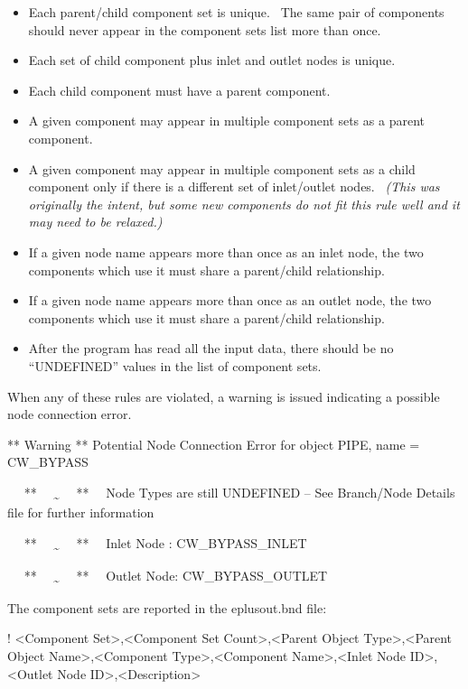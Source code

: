 \begin{itemize}
\item
  Each parent/child component set is unique.~ The same pair of components should never appear in the component sets list more than once.
\item
  Each set of child component plus inlet and outlet nodes is unique.
\item
  Each child component must have a parent component.
\item
  A given component may appear in multiple component sets as a parent component.
\item
  A given component may appear in multiple component sets as a child component only if there is a different set of inlet/outlet nodes.~ \emph{(This was originally the intent, but some new components do not fit this rule well and it may need to be relaxed.)}
\item
  If a given node name appears more than once as an inlet node, the two components which use it must share a parent/child relationship.
\item
  If a given node name appears more than once as an outlet node, the two components which use it must share a parent/child relationship.
\item
  After the program has read all the input data, there should be no ``UNDEFINED'' values in the list of component sets.
\end{itemize}

When any of these rules are violated, a warning is issued indicating a possible node connection error.

** Warning ** Potential Node Connection Error for object PIPE, name = CW\_BYPASS

~~ **~~ \textsubscript{\textasciitilde{}}~~ **~~ Node Types are still UNDEFINED -- See Branch/Node Details file for further information

~~ **~~ \textsubscript{\textasciitilde{}}~~ **~~ Inlet Node : CW\_BYPASS\_INLET

~~ **~~ \textsubscript{\textasciitilde{}}~~ **~~ Outlet Node: CW\_BYPASS\_OUTLET

The component sets are reported in the eplusout.bnd file:

! \textless{}Component Set\textgreater{},\textless{}Component Set Count\textgreater{},\textless{}Parent Object Type\textgreater{},\textless{}Parent Object Name\textgreater{},\textless{}Component Type\textgreater{},\textless{}Component Name\textgreater{},\textless{}Inlet Node ID\textgreater{},\textless{}Outlet Node ID\textgreater{},\textless{}Description\textgreater{}


